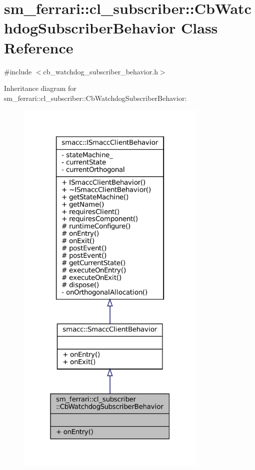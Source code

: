 \hypertarget{classsm__ferrari_1_1cl__subscriber_1_1CbWatchdogSubscriberBehavior}{}\section{sm\+\_\+ferrari\+:\+:cl\+\_\+subscriber\+:\+:Cb\+Watchdog\+Subscriber\+Behavior Class Reference}
\label{classsm__ferrari_1_1cl__subscriber_1_1CbWatchdogSubscriberBehavior}


{\ttfamily \#include $<$cb\+\_\+watchdog\+\_\+subscriber\+\_\+behavior.\+h$>$}



Inheritance diagram for sm\+\_\+ferrari\+:\+:cl\+\_\+subscriber\+:\+:Cb\+Watchdog\+Subscriber\+Behavior\+:
\nopagebreak
\begin{figure}[H]
\begin{center}
\leavevmode
\includegraphics[width=258pt]{classsm__ferrari_1_1cl__subscriber_1_1CbWatchdogSubscriberBehavior__inherit__graph}
\end{center}
\end{figure}


